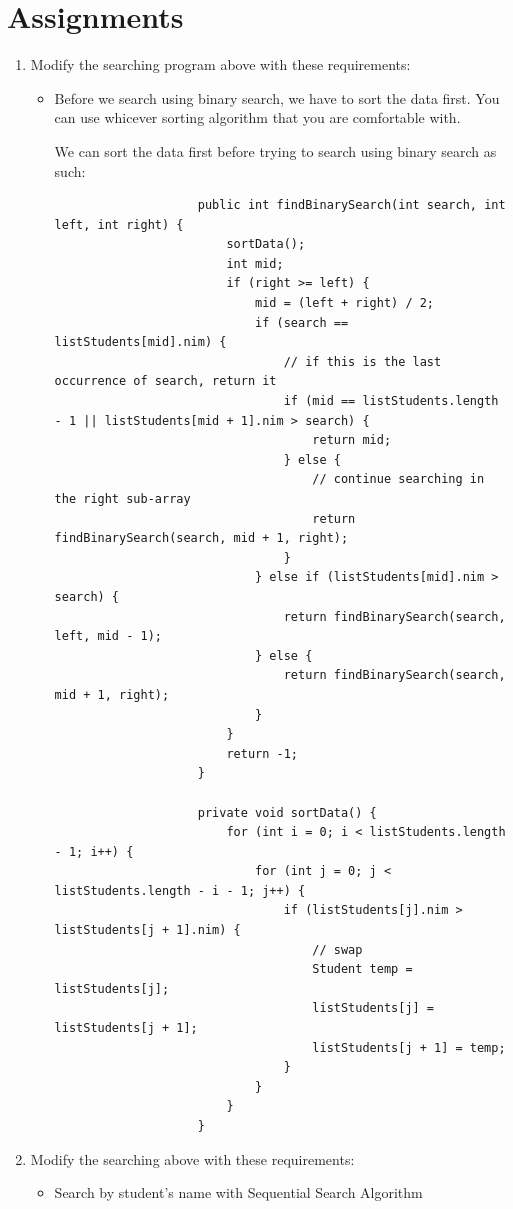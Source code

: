 \documentclass[12pt,titlepage]{article}
\begin{document}
\section{Assignments}
\begin{enumerate}
    \item {
        Modify the searching program above with these requirements:
        \begin{itemize}
            \item {
                Before we search using binary search, we have to sort the data first. You can use whicever sorting algorithm that you are comfortable with.

                We can sort the data first before trying to search using binary search as such:

                \begin{verbatim}
                    public int findBinarySearch(int search, int left, int right) {
                        sortData();
                        int mid;
                        if (right >= left) {
                            mid = (left + right) / 2;
                            if (search == listStudents[mid].nim) {
                                // if this is the last occurrence of search, return it
                                if (mid == listStudents.length - 1 || listStudents[mid + 1].nim > search) {
                                    return mid;
                                } else {
                                    // continue searching in the right sub-array
                                    return findBinarySearch(search, mid + 1, right);
                                }
                            } else if (listStudents[mid].nim > search) {
                                return findBinarySearch(search, left, mid - 1);
                            } else {
                                return findBinarySearch(search, mid + 1, right);
                            }
                        }
                        return -1;
                    }

                    private void sortData() {
                        for (int i = 0; i < listStudents.length - 1; i++) {
                            for (int j = 0; j < listStudents.length - i - 1; j++) {
                                if (listStudents[j].nim > listStudents[j + 1].nim) {
                                    // swap
                                    Student temp = listStudents[j];
                                    listStudents[j] = listStudents[j + 1];
                                    listStudents[j + 1] = temp;
                                }
                            }
                        }
                    }
                \end{verbatim}
            }
        \end{itemize}
    }
    \item {
        Modify the searching above with these requirements:
        \begin{itemize}
            \item {
                Search by student's name with Sequential Search Algorithm

}
\end{itemize}}
\end{enumerate}
\end{document}

